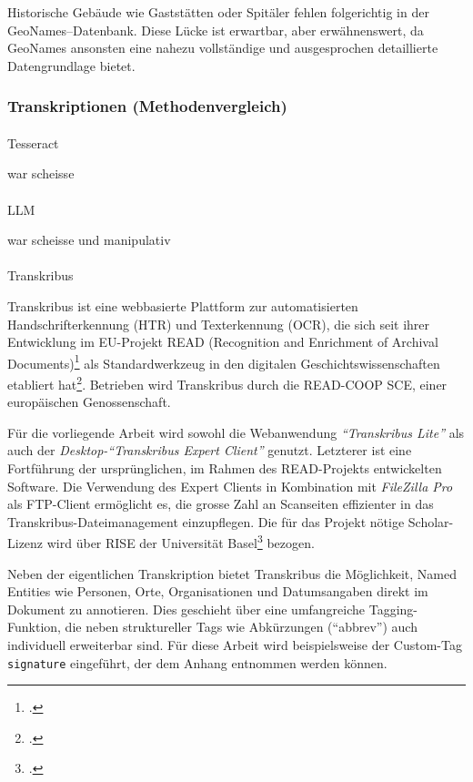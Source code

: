 \documentclass[12pt, a4paper, ngerman, bidi=default]{article}
\makeatletter
\let\cite\footcite
\let\oldparagraph\paragraph%
\renewcommand{\paragraph}{
    \@ifstar%
      \xxxParagraphStar%
      \xxxParagraphNoStar%
 }
\newcommand{\xxxParagraphStar}[1]{\oldparagraph*{#1}\mbox{}}
\newcommand{\xxxParagraphNoStar}[1]{\oldparagraph{#1}\mbox{}}
\makeatother
\begin{document}
Historische Gebäude wie Gaststätten oder Spitäler fehlen folgerichtig in der GeoNames–Datenbank. Diese Lücke ist erwartbar, aber erwähnenswert, da GeoNames 
ansonsten eine nahezu vollständige und ausgesprochen detaillierte Datengrundlage bietet.

\subsubsection{Transkriptionen (Methodenvergleich)}\label{section:Transkriptionen_Methoden}
\paragraph{Tesseract}

war scheisse

\paragraph{LLM}

war scheisse und manipulativ

\paragraph{Transkribus}

Transkribus ist eine webbasierte Plattform zur automatisierten Handschrifterkennung (HTR) und Texterkennung (OCR), die sich seit ihrer Entwicklung im EU-Projekt READ 
(Recognition and Enrichment of Archival Documents)\cite[vgl.][]{noauthor_recognition_nodate} als Standardwerkzeug in den digitalen Geschichtswissenschaften etabliert 
hat\cite[vgl.][postnote]{muhlberger_transkribus_2019}. Betrieben wird Transkribus durch die READ-COOP SCE, einer europäischen Genossenschaft.

Für die vorliegende Arbeit wird sowohl die Webanwendung \textit{\enquote{Transkribus Lite}} als auch der \textit{Desktop-\enquote{Transkribus Expert Client}} genutzt. 
Letzterer ist eine Fortführung der ursprünglichen, im Rahmen des READ-Projekts entwickelten Software. Die Verwendung des Expert Clients in Kombination mit \textit{FileZilla Pro} 
als FTP-Client ermöglicht es, die grosse Zahl an Scanseiten effizienter in das Transkribus-Dateimanagement einzupflegen. Die für das Projekt nötige Scholar-Lizenz wird über 
RISE der Universität Basel\cite[weitere Informationen:][postnote]{decker_home_nodate} bezogen.

Neben der eigentlichen Transkription bietet Transkribus die Möglichkeit, Named Entities wie Personen, Orte, Organisationen und Datumsangaben direkt im Dokument zu annotieren. 
Dies geschieht über eine umfangreiche Tagging-Funktion, die neben struktureller Tags wie Abkürzungen (\enquote{abbrev}) auch individuell erweiterbar sind. Für diese Arbeit wird 
beispielsweise der Custom-Tag \colorbox{signature}{\texttt{signature}} eingeführt, der dem Anhang entnommen werden können.
\end{document}
